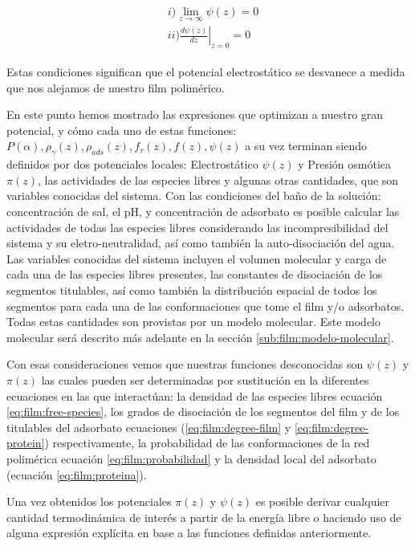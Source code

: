 \begin{align}
	\begin{aligned}
		&i)  \lim_{z\to\infty}\psi(z) = 0 \\
		&ii) \left.\frac{d\psi(z)}{dz}\right|_{z=0} = 0
		\label{eq:film:contorno}
	\end{aligned}
\end{align}

Estas condiciones significan que el potencial electrost\'atico se desvanece a medida que nos alejamos de nuestro film polim\'erico.

En este punto hemos mostrado las expresiones que optimizan a nuestro gran potencial, y c\'omo cada uno de estas funciones: $P(\alpha), \rho_\gamma(z),\rho_{ads}(z), f_\tau(z), f(z), \psi(z) $ a su vez  terminan siendo definidos por dos potenciales locales: Electrost\'atico $\psi(z)$ y Presi\'on osm\'otica $\pi(z)$, las actividades de las especies libres y algunas otras cantidades, que son variables conocidas del sistema.
Con las condiciones del ba\~no de la soluci\'on: concentraci\'on de sal, el pH, y concentraci\'on de adsorbato es posible calcular las actividades de todas las especies libres considerando las incompresibilidad del sistema y su eletro-neutralidad, as\'i como tambi\'en la auto-disociaci\'on del agua.  
Las variables conocidas del sistema incluyen el volumen molecular y carga de cada una de las especies libres presentes, las constantes de disociaci\'on de los segmentos titulables, as\'i como tambi\'en la distribuci\'on espacial de todos los segmentos para cada una de las conformaciones que tome el film y/o adsorbatos. Todas estas cantidades son provistas por un modelo molecular. Este modelo molecular ser\'a descrito m\'as adelante en la secci\'on \ref{sub:film:modelo-molecular}.

Con esas consideraciones vemos que nuestras funciones desconocidas son  $\psi(z)$ y $\pi(z)$ las cuales pueden ser determinadas por sustituci\'on en la diferentes ecuaciones en las que interact\'uan: la densidad de las especies libres ecuaci\'on  \ref{eq:film:free-species}, los grados de disociaci\'on de los segmentos del film y de los  titulables del adsorbato ecuaciones (\ref{eq:film:degree-film} y \ref{eq:film:degree-protein}) respectivamente, la probabilidad de las conformaciones de la red polim\'erica ecuaci\'on \ref{eq:film:probabilidad} y la densidad local del adsorbato (ecuaci\'on \ref{eq:film:proteina}).

Una vez obtenidos los potenciales $\pi(z)$ y $\psi(z)$ es posible derivar  cualquier cantidad termodin\'amica de inter\'es  a partir de la energ\'ia libre o haciendo uso de alguna expresi\'on expl\'icita en base a las funciones definidas anteriormente.

